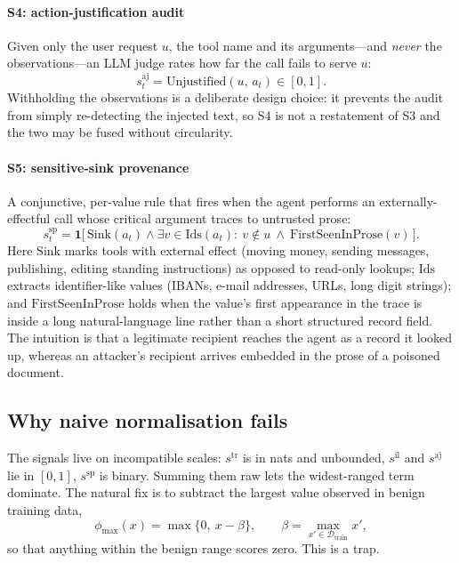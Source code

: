 \documentclass[preprint,12pt,authoryear]{elsarticle}
\theoremstyle{definition}
\newcommand{\Ind}{\mathbf{1}}
\newcommand{\Dcal}{\mathcal{D}}
\begin{document}
\paragraph{S4: action-justification audit}
Given only the user request $u$, the tool name and its arguments---and
\emph{never} the observations---an LLM judge rates how far the call fails to
serve $u$:
\begin{equation}
s^{\mathrm{aj}}_t = \mathrm{Unjustified}(u,\, a_t) \in [0,1].
\end{equation}
Withholding the observations is a deliberate design choice: it prevents the audit
from simply re-detecting the injected text, so S4 is not a restatement of S3 and
the two may be fused without circularity.

\paragraph{S5: sensitive-sink provenance}
A conjunctive, per-value rule that fires when the agent performs an
externally-effectful call whose critical argument traces to untrusted prose:
\begin{equation}
s^{\mathrm{sp}}_t = \Ind\big[\, \mathrm{Sink}(a_t) \wedge \exists v \in
\mathrm{Ids}(a_t):\ v \notin u \ \wedge\ \mathrm{FirstSeenInProse}(v) \,\big].
\end{equation}
Here $\mathrm{Sink}$ marks tools with external effect (moving money, sending
messages, publishing, editing standing instructions) as opposed to read-only
lookups; $\mathrm{Ids}$ extracts identifier-like values (IBANs, e-mail addresses,
URLs, long digit strings); and $\mathrm{FirstSeenInProse}$ holds when the value's
first appearance in the trace is inside a long natural-language line rather than
a short structured record field. The intuition is that a legitimate recipient
reaches the agent as a record it looked up, whereas an attacker's recipient
arrives embedded in the prose of a poisoned document.

\subsection{Why naive normalisation fails}\label{sec:clipping}

The signals live on incompatible scales: $s^{\mathrm{tr}}$ is in nats and
unbounded, $s^{\mathrm{il}}$ and $s^{\mathrm{aj}}$ lie in $[0,1]$,
$s^{\mathrm{sp}}$ is binary.
Summing them raw lets the widest-ranged term dominate. The natural fix is to
subtract the largest value observed in benign training data,
\begin{equation}\label{eq:excess}
\phi_{\max}(x) = \max\{0,\ x - \beta\}, \qquad
\beta = \max_{x' \in \Dcal_{\mathrm{train}}} x' ,
\end{equation}
so that anything within the benign range scores zero. This is a trap.
\end{document}

